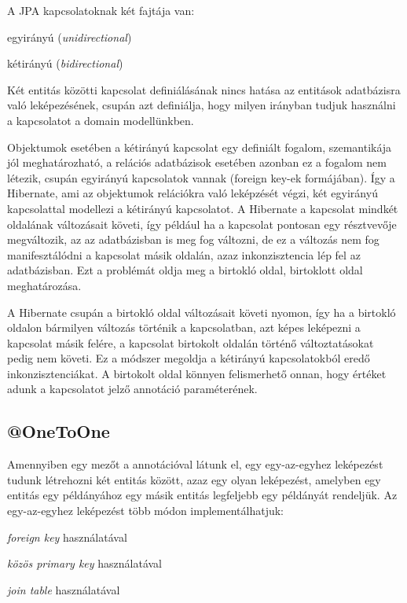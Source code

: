 A JPA kapcsolatoknak két fajtája van:
\begin{listing}
	\item egyirányú (\emph{unidirectional})
	\item kétirányú (\emph{bidirectional})
\end{listing}

Két entitás közötti kapcsolat definiálásának nincs hatása az entitások adatbázisra való leképezésének, csupán azt definiálja, hogy milyen irányban tudjuk használni a kapcsolatot a domain modellünkben. \par

Objektumok esetében a kétirányú kapcsolat egy definiált fogalom, szemantikája jól meghatározható, a relációs adatbázisok esetében azonban ez a fogalom nem létezik, csupán egyirányú kapcsolatok vannak (foreign key-ek formájában). Így a Hibernate, ami az objektumok relációkra való leképzését végzi, két egyirányú kapcsolattal modellezi a kétirányú kapcsolatot. A Hibernate a kapcsolat mindkét oldalának változásait követi, így például ha a kapcsolat pontosan egy résztvevője megváltozik, az az adatbázisban is meg fog változni, de ez a változás nem fog manifesztálódni a kapcsolat másik oldalán, azaz inkonzisztencia lép fel az adatbázisban. Ezt a problémát oldja meg a birtokló oldal, birtoklott oldal meghatározása. \par

A Hibernate csupán a birtokló oldal változásait követi nyomon, így ha a birtokló oldalon bármilyen változás történik a kapcsolatban, azt képes leképezni a kapcsolat másik felére, a kapcsolat birtokolt oldalán történő változtatásokat pedig nem követi. Ez a módszer megoldja a kétirányú kapcsolatokból eredő inkonzisztenciákat. A birtokolt oldal könnyen felismerhető onnan, hogy értéket adunk a kapcsolatot jelző annotáció  paraméterének. \par

\subsection{@OneToOne}

Amennyiben egy mezőt a  annotációval látunk el, egy egy-az-egyhez leképezést tudunk létrehozni két entitás között, azaz egy olyan leképezést, amelyben egy entitás egy példányához egy másik entitás legfeljebb egy példányát rendeljük. Az egy-az-egyhez leképezést több módon implementálhatjuk:

\begin{listing}
	\item \emph{foreign key} használatával
	\item \emph{közös primary key} használatával
	\item \emph{join table} használatával
\end{listing}

